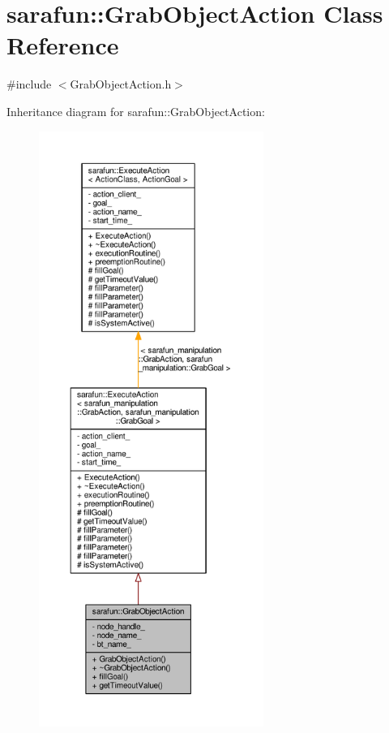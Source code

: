 \hypertarget{classsarafun_1_1GrabObjectAction}{\section{sarafun\-:\-:Grab\-Object\-Action Class Reference}
\label{classsarafun_1_1GrabObjectAction}
}


{\ttfamily \#include $<$Grab\-Object\-Action.\-h$>$}



Inheritance diagram for sarafun\-:\-:Grab\-Object\-Action\-:\nopagebreak
\begin{figure}[H]
\begin{center}
\leavevmode
\includegraphics[height=550pt]{db/dc6/classsarafun_1_1GrabObjectAction__inherit__graph}
\end{center}
\end{figure}


